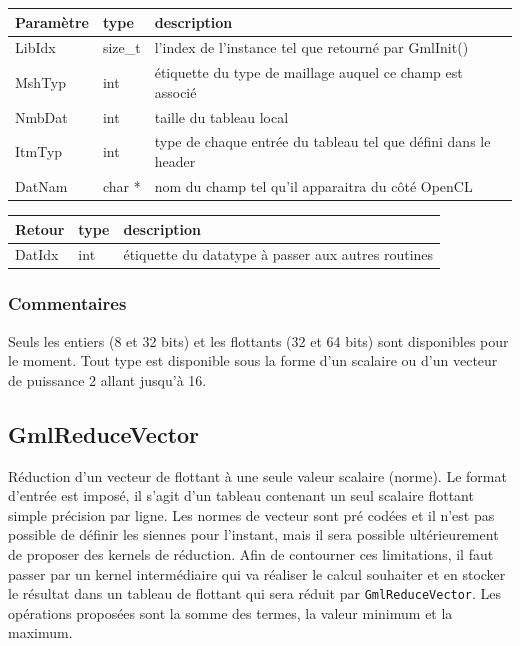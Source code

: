 \documentclass[a4paper,12pt]{article}
\begin{document}
\begin{tabular}{|m{2cm}|m{1.5cm}|m{10.5cm}|}
\hline
Paramètre  & type    & description \\
\hline
LibIdx     & size\_t & l'index de l'instance tel que retourné par GmlInit() \\
\hline
MshTyp     & int     & étiquette du type de maillage auquel ce champ est associé \\
\hline
NmbDat     & int     & taille du tableau local \\
\hline
ItmTyp     & int     & type de chaque entrée du tableau tel que défini dans le header \\
\hline
DatNam     & char *  & nom du champ tel qu'il apparaitra du côté OpenCL \\
\hline
\end{tabular}

\medskip

\begin{tabular}{|m{2cm}|m{1.5cm}|m{10.5cm}|}
\hline
Retour     & type   & description \\
\hline
DatIdx     & int    & étiquette du datatype à passer aux autres routines \\
\hline
\end{tabular}

\subsubsection*{Commentaires}
Seuls les entiers (8 et 32 bits) et les flottants (32 et 64 bits) sont disponibles pour le moment.
Tout type est disponible sous la forme d'un scalaire ou d'un vecteur de puissance 2 allant jusqu'à 16.


\subsection{GmlReduceVector}

Réduction d'un vecteur de flottant à une seule valeur scalaire (norme).
Le format d'entrée est imposé, il s'agit d'un tableau contenant un seul scalaire flottant simple précision par ligne.
Les normes de vecteur sont pré codées et il n'est pas possible de définir les siennes pour l'instant, mais il sera possible ultérieurement de proposer des kernels de réduction.
Afin de contourner ces limitations, il faut passer par un kernel intermédiaire qui va réaliser le calcul souhaiter et en stocker le résultat dans un tableau de flottant qui sera réduit par {\tt GmlReduceVector}.
Les opérations proposées sont la somme des termes, la valeur minimum et la maximum.
\end{document}
